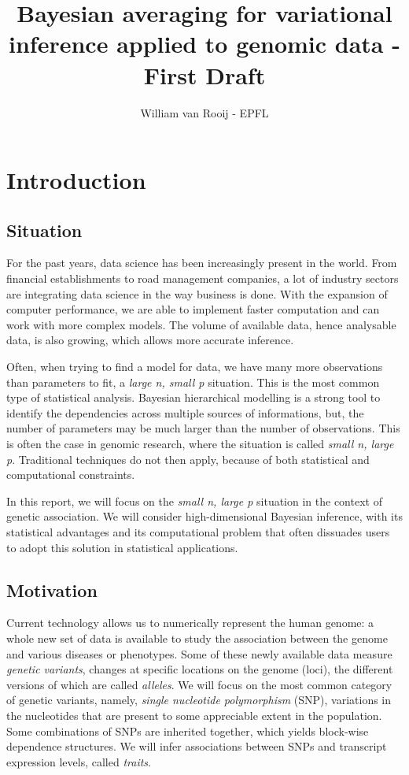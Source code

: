 \documentclass[a4paper, 11pt]{report}
\numberwithin{equation}{chapter}
\begin{document}
\SetEndCharOfAlgoLine{}

\title{Bayesian averaging for variational inference applied to genomic data - First Draft}
\author{William van Rooij - EPFL}

\maketitle

\newpage
\tableofcontents
\newpage
\chapter{Introduction}
\section{Situation}
For the past years, data science has been increasingly present in the world. From financial establishments to road management companies, a lot of industry sectors are integrating data science in the way business is done. With the expansion of computer performance, we are able to implement faster computation and can work with more complex models. The volume of available data, hence analysable data, is also growing, which allows more accurate inference.

Often, when trying to find a model for data, we have many more observations than parameters to fit, a \textit{large n, small p} situation. This is the most common type of statistical analysis. Bayesian hierarchical modelling is a strong tool to identify the dependencies across multiple sources of informations, but, the number of parameters may be much larger than the number of observations. This is often the case in genomic research, where the situation is called \textit{small n, large p}. Traditional techniques do not then apply, because of both statistical and computational constraints.

In this report, we will focus on the \textit{small n, large p} situation in the context of genetic association. We will consider high-dimensional Bayesian inference, with its statistical advantages and its computational problem that often dissuades users to adopt this solution in statistical applications.

\section{Motivation}
Current technology allows us to numerically represent the human genome: a whole new set of data is available to study the association between the genome and various diseases or phenotypes.  Some of these newly available data measure \textit{genetic variants}, changes at specific locations on  the genome (loci), the different versions of which are called \textit{alleles}. We will focus on the most common category of genetic variants, namely, \textit{single nucleotide polymorphism} (SNP), variations in the nucleotides that are present to some appreciable extent in the population. Some combinations of SNPs are inherited together, which yields block-wise dependence structures. We will infer associations between SNPs and transcript expression levels, called \textit{traits}.
\end{document}
